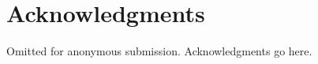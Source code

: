
	\maketitle
	
	
	
	
	
	
	
	
	
	
	\section*{Acknowledgments}
	\ifanonymized
	Omitted for anonymous submission.
	\else
	Acknowledgments go here.
	\fi
	
	\ifroughdraft\clearpage\fi
	\clearpage
	
	
	
	
	

